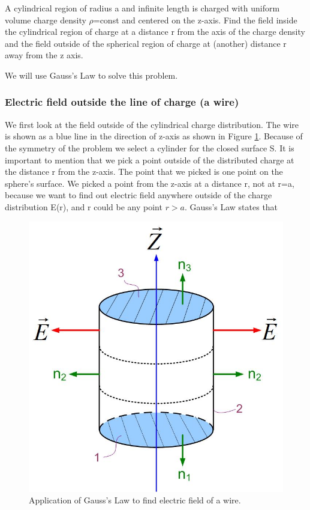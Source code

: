 \documentclass{ximera}
\begin{document}
A cylindrical region of radius a and infinite length is charged with uniform volume charge density $\rho$=const and centered on the z-axis. Find the field inside the cylindrical region of charge at a distance r from the axis of the charge density and the field outside of the spherical region of charge at (another) distance r away from the z axis.

We will use Gauss's Law to solve this problem.



\subsubsection{Electric field outside the line of charge (a wire)}



 We first look at the field  outside of the cylindrical charge distribution. The wire is shown as a blue line in the direction of z-axis as shown in Figure \ref{fig:gaussLineOut}.  Because of the symmetry of the problem we select a cylinder for the closed surface S. It is important to mention that we pick a point outside of the distributed charge at the distance r from the z-axis. The point that we picked is one point on the sphere's surface. We picked a point from the z-axis at a distance r, not at r=a, because we want to find out electric field anywhere outside of the charge distribution E(r), and r could be any point $r>a$. Gauss's Law states that



\begin{figure}[htbp]
\begin{center}
\includegraphics[scale=0.5]{../jpg/gausslawcylinder.jpg}
\end{center}
\caption{Application of Gauss's Law to find electric field of a wire.}
\label{fig:gaussLineOut}
\end{figure}
\end{document}
